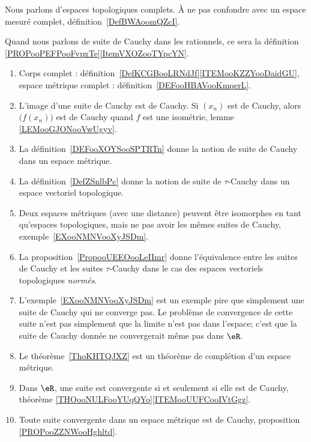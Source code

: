     \label{THMooOCXTooWenIJE}

Nous parlons d'espaces topologiques complets. À ne pas confondre avec un espace mesuré complet, définition~\ref{DefBWAoomQZcI}.

Quand nous parlons de suite de Cauchy dans les rationnels, ce sera la définition \ref{PROPooPEFPooFvpxTe}\ref{ItemVXOZooTYpcYN}.


\begin{enumerate}
	\item
	      Corps complet : définition~\ref{DefKCGBooLRNdJf}\ref{ITEMooKZZYooDaidGU}, espace métrique complet : définition~\ref{DEFooHBAVooKmqerL}.
	\item
	      L'image d'une suite de Cauchy est de Cauchy. Si \( (x_n)\) est de Cauchy, alors \( \big( f(x_n) \big)\) est de Cauchy quand \( f\) est une isométrie, lemme \ref{LEMooGJONooVwUgyv}.
	\item
	      La définition~\ref{DEFooXOYSooSPTRTn} donne la notion de suite de Cauchy dans un espace métrique.
	\item
	      La définition~\ref{DefZSnlbPc} donne la notion de suite de \( \tau\)-Cauchy dans un espace vectoriel topologique.
	\item
	      Deux espaces métriques (avec une distance) peuvent être isomorphes en tant qu'espaces topologiques, mais ne pas avoir les mêmes suites de Cauchy, exemple~\ref{EXooNMNVooXyJSDm}.
	\item
	      La proposition~\ref{PropooUEEOooLeIImr} donne l'équivalence entre les suites de Cauchy et les suites \( \tau\)-Cauchy dans le cas des espaces vectoriels topologiques \emph{normés}.
	\item
	      L'exemple~\ref{EXooNMNVooXyJSDm} est un exemple pire que simplement une suite de Cauchy qui ne converge pas. Le problème de convergence de cette suite n'est pas simplement que la limite n'est pas dans l'espace; c'est que la suite de Cauchy donnée ne convergerait même pas dans \( \eR\).
	\item
	      Le théorème~\ref{ThoKHTQJXZ} est un théorème de complétion d'un espace métrique.
	\item
	      Dans \( \eR\), une suite est convergente si et seulement si elle est de Cauchy, théorème \ref{THOooNULFooYUqQYo}\ref{ITEMooUUFCooIVtGgz}.
	\item
	      Toute suite convergente dans un espace métrique est de Cauchy, proposition \ref{PROPooZZNWooHghltd}.
\end{enumerate}

